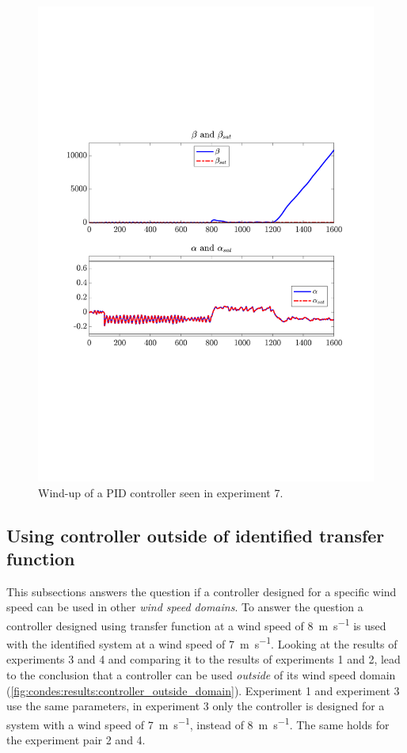 \begin{figure}[H]
    \center
    \includegraphics[width=0.7\linewidth, trim=50 230 55 180,clip]{fig/Open_loop/exp_7_in.pdf}
    \caption{Wind-up of a PID controller seen in experiment 7.}
    \label{fig:condes:results:wind_up}
\end{figure}


\subsection{Using controller outside of identified transfer function}

This subsections answers the question if a controller designed for a specific wind speed can be used in other \textit{wind speed domains}.
To answer the question a controller designed using transfer function at a wind speed of \SI{8}{\metre\per\second} is used with the identified system at a wind speed of \SI{7}{\meter\per\second}.
Looking at the results of experiments 3 and 4 and comparing it to the results of experiments 1 and 2, lead to the conclusion that a controller can be used \textit{outside} of its wind speed domain (\autoref{fig:condes:results:controller_outside_domain}).
Experiment 1 and experiment 3 use the same parameters, in experiment 3 only the controller is designed for a system with a wind speed of \SI{7}{\metre\per\second}, instead of \SI{8}{\metre\per\second}.
The same holds for the experiment pair 2 and 4.


